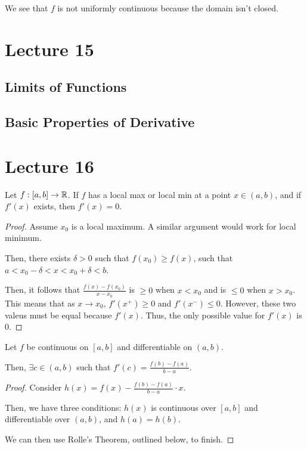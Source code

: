 \documentclass{book}
\begin{document}
We see that $f$ is not uniformly continuous because the domain isn't closed.
\section{Lecture 15}
\subsection{Limits of Functions}
\subsection{Basic Properties of Derivative}
\section{Lecture 16}
\begin{thm}
    Let $f : [a, b] \to \mathbb{R}$. If $f$ has a local max or local min at a point $x \in (a, b)$, and if $f'(x)$ exists, then $f'(x) = 0$.
\end{thm}

\begin{proof}
    Assume $x_0$ is a local maximum. A similar argument would work for local minimum.

    Then, there exists $\delta > 0$ such that $f(x_0) \geq f(x)$, such that $a < x_0 - \delta < x < x_0 + \delta < b$.

    Then, it follows that $\frac{f(x) - f(x_0)}{x - x_0}$ is $\geq 0$ when $x < x_0$ and is $\leq 0$ when $x > x_0$. This means that as $x \to x_0$, $f'(x^+) \geq 0$ and $f'(x^-) \leq 0$. However, these two valeus must be equal because $f'(x)$. Thus, the only possible value for $f'(x)$ is $0$.
\end{proof}

\begin{thm}
    Let $f$ be continuous on $[a, b]$ and differentiable on $(a, b)$.

    Then, $\exists c \in (a, b)$ such that $f'(c) = \frac{f(b) - f(a)}{b - a}$.
\end{thm}

\begin{proof}
    Consider $h(x) = f(x) - \frac{f(b) - f(a)}{b - a} \cdot x$.

    Then, we have three conditions: $h(x)$ is continuous over $[a, b]$ and differentiable over $(a, b)$, and $h(a) = h(b)$.

    We can then use Rolle's Theorem, outlined below, to finish.
\end{proof}
\end{document}
